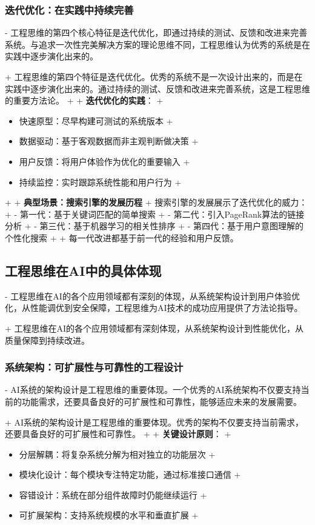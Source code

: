\subsubsection{迭代优化：在实践中持续完善}

- 工程思维的第四个核心特征是迭代优化，即通过持续的测试、反馈和改进来完善系统。与追求一次性完美解决方案的理论思维不同，工程思维认为优秀的系统是在实践中逐步演化出来的。

+ 工程思维的第四个特征是迭代优化。优秀的系统不是一次设计出来的，而是在实践中逐步演化出来的。通过持续的测试、反馈和改进来完善系统，这是工程思维的重要方法论。
+
+ \textbf{迭代优化的实践}：
+ \begin{itemize}
+ \item 快速原型：尽早构建可测试的系统版本
+ \item 数据驱动：基于客观数据而非主观判断做决策
+ \item 用户反馈：将用户体验作为优化的重要输入
+ \item 持续监控：实时跟踪系统性能和用户行为
+ \end{itemize}
+
+ \textbf{典型场景：搜索引擎的发展历程}
+ 搜索引擎的发展展示了迭代优化的威力：
+ - 第一代：基于关键词匹配的简单搜索
+ - 第二代：引入PageRank算法的链接分析
+ - 第三代：基于机器学习的相关性排序
+ - 第四代：基于用户意图理解的个性化搜索
+
+ 每一代改进都基于前一代的经验和用户反馈。

\subsection{工程思维在AI中的具体体现}

- 工程思维在AI的各个应用领域都有深刻的体现，从系统架构设计到用户体验优化，从性能调优到安全保障，工程思维为AI技术的成功应用提供了方法论指导。

+ 工程思维在AI的各个应用领域都有深刻体现，从系统架构设计到性能优化，从质量保障到持续改进。

\subsubsection{系统架构：可扩展性与可靠性的工程设计}

- AI系统的架构设计是工程思维的重要体现。一个优秀的AI系统架构不仅要支持当前的功能需求，还要具备良好的可扩展性和可靠性，能够适应未来的发展需要。

+ AI系统的架构设计是工程思维的重要体现。优秀的架构不仅要支持当前需求，还要具备良好的可扩展性和可靠性。
+
+ \textbf{关键设计原则}：
+ \begin{itemize}
+ \item 分层解耦：将复杂系统分解为相对独立的功能层次
+ \item 模块化设计：每个模块专注特定功能，通过标准接口通信
+ \item 容错设计：系统在部分组件故障时仍能继续运行
+ \item 可扩展架构：支持系统规模的水平和垂直扩展
+ \end{itemize}

